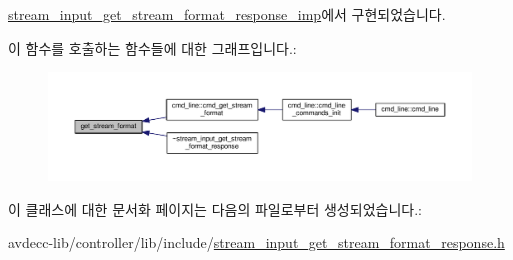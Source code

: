 \hyperlink{classavdecc__lib_1_1stream__input__get__stream__format__response__imp_a853524daa61b51c7cba18fbb01bc078e}{stream\+\_\+input\+\_\+get\+\_\+stream\+\_\+format\+\_\+response\+\_\+imp}에서 구현되었습니다.



이 함수를 호출하는 함수들에 대한 그래프입니다.\+:
\nopagebreak
\begin{figure}[H]
\begin{center}
\leavevmode
\includegraphics[width=350pt]{classavdecc__lib_1_1stream__input__get__stream__format__response_aba7b3a3a06d9c53ef54e43787fa46a7a_icgraph}
\end{center}
\end{figure}




이 클래스에 대한 문서화 페이지는 다음의 파일로부터 생성되었습니다.\+:\begin{DoxyCompactItemize}
\item 
avdecc-\/lib/controller/lib/include/\hyperlink{stream__input__get__stream__format__response_8h}{stream\+\_\+input\+\_\+get\+\_\+stream\+\_\+format\+\_\+response.\+h}\end{DoxyCompactItemize}
